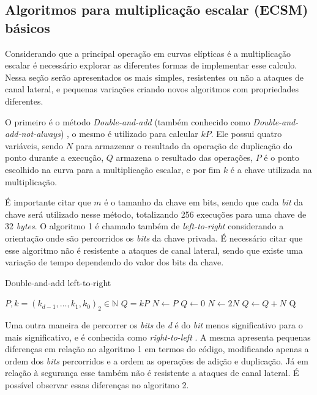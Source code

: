 \subsection{Algoritmos para multiplicação escalar (ECSM) básicos}
Considerando que a principal operação em curvas elípticas é a multiplicação escalar é necessário explorar as diferentes formas de implementar esse calculo. Nessa seção serão apresentados os mais simples, resistentes ou não a ataques de canal lateral, e pequenas variações criando novos algoritmos com propriedades diferentes.

O primeiro é o método \textit{Double-and-add} (também conhecido como \textit{Double-and-add-not-always}) \cite{rivain:2011}, o mesmo é utilizado para calcular $kP$. Ele possui quatro variáveis, sendo $N$ para armazenar o resultado da operação de duplicação do ponto durante a execução, $Q$ armazena o resultado das operações, $P$ é o ponto escolhido na curva para a multiplicação escalar, e por fim $k$ é a chave utilizada na multiplicação.

É importante citar que $m$ é o tamanho da chave em bits, sendo que cada \textit{bit} da chave será utilizado nesse método, totalizando 256 execuções para uma chave de 32 \textit{bytes}. O algoritmo 1 é chamado também de \textit{left-to-right} considerando a orientação onde são percorridos os \textit{bits} da chave privada. É necessário citar que esse algoritmo não é resistente a ataques de canal lateral, sendo que existe uma variação de tempo dependendo do valor dos bits da chave.

\begin{algorithm}
\caption{Double-and-add left-to-right}
\begin{algorithmic} 
    \REQUIRE $P, k=(k_{d-1},\ldots,k_1,k_0)_2 \in \mathbb{N}$
    \ENSURE $Q = kP$
    \STATE $N \leftarrow P$
    \STATE $Q \leftarrow 0$
        \STATE $N \leftarrow 2N$
            \STATE $Q \leftarrow Q+N$
        \ENDIF
    \ENDFOR
    \RETURN Q
    \end{algorithmic}
\end{algorithm}

Uma outra maneira de percorrer os \textit{bits} de \textit{d} é do \textit{bit} menos significativo para o  mais significativo, e é conhecida como \textit{right-to-left} \cite{rivain:2011}. A mesma apresenta pequenas diferenças em relação ao algoritmo 1 em termos do código, modificando apenas a ordem dos \textit{bits} percorridos e a ordem as operações de adição e duplicação. Já em relação à segurança esse também não é resistente a ataques de canal lateral. É possível observar essas diferenças no algoritmo 2.

